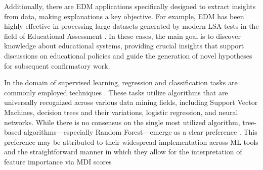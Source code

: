 Additionally, there are \gls{EDM} applications specifically designed to extract insights from data, making explanations a key objective. For example, \gls{EDM} has been highly effective in processing large datasets generated by modern \gls{LSA} tests in the field of Educational Assessment \cite{Liu2008UsingEnergy, CardosoSilvaFilho2023BeyondEffectiveness, SilvaFilho2023LeveragingEducation, Saarela2016PredictingApproach}. In these cases, the main goal is to discover knowledge about educational systems, providing crucial insights that support discussions on educational policies and guide the generation of novel hypotheses for subsequent confirmatory work.

In the domain of supervised learning, regression and classification tasks are commonly employed techniques \cite{Aldowah2019EducationalSynthesis}. These tasks utilize algorithms that are universally recognized across various data mining fields, including Support Vector Machines, decision trees and their variations, logistic regression, and neural networks. While there is no consensus on the single most utilized algorithm, tree-based algorithms—especially Random Forest—emerge as a clear preference \cite{Rastrollo-Guerrero2020AnalyzingReview, Khan2021StudentStudies, Martinez-Abad2020EducationalAssessment, Namoun2020PredictingReview}. This preference may be attributed to their widespread implementation across \gls{ML} tools and the straightforward manner in which they allow for the interpretation of feature importance via \gls{MDI} scores





